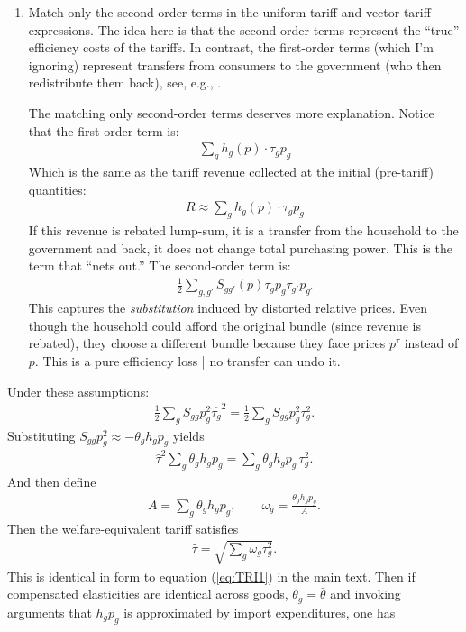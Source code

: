 \documentclass[12pt,pdftex]{article}
\begin{document}
\begin{onehalfspacing}
\begin{enumerate}
\item Match only the second-order terms in the uniform-tariff and vector-tariff expressions. The idea here is that the second-order terms represent the ``true'' efficiency costs of the tariffs. In contrast, the first-order terms (which I'm ignoring) represent transfers from consumers to the government (who then redistribute them back), see, e.g., \citet{feenstra1995estimating}.
    
    The matching only second-order terms deserves more explanation. Notice that the first-order term is:
\begin{align}
    \sum_g h_g(p) \cdot \tau_g p_g
\end{align}
Which is the same as the tariff revenue collected at the initial (pre-tariff) quantities:
\begin{align}
    R \approx \sum_g  h_g(p) \cdot \tau_g p_g 
\end{align}
If this revenue is rebated lump-sum, it is a transfer from the household to the government and back, it does not change total purchasing power. This is the term that ``nets out.'' The second-order term is:
\begin{align}
    \frac{1}{2} \sum_{g,g'} S_{gg'}(p) \tau_g p_g \tau_{g'} p_{g'}
\end{align}
This captures the \textit{substitution} induced by distorted relative prices. Even though the household could afford the original bundle (since revenue is rebated), they choose a different bundle because they face prices $p^\tau$ instead of $p$. This is a pure efficiency loss | no transfer can undo it. 
\end{enumerate}
Under these assumptions:
\begin{align}
\frac{1}{2} \sum_g S_{gg} p_g^2 \hat{\tau_g}^2
=
\frac{1}{2} \sum_g S_{gg} p_g^2 \tau_g^2.
\end{align}
Substituting $S_{gg} p_g^2 \approx -\theta_g h_g p_g$ yields
\begin{align}
\hat{\tau}^2 \sum_g \theta_g h_g p_g
=
\sum_g \theta_g h_g p_g\,\tau_g^2.
\end{align}
And then define
\begin{align}
A = \sum_g \theta_g h_g p_g,
\qquad
\omega_g = \frac{\theta_g h_g p_g}{A}.
\end{align}
Then the welfare-equivalent tariff satisfies
\begin{align}
\hat{\tau} = \sqrt{\sum_g \omega_g \tau_g^2}.
\label{eq:TRI_appendix}
\end{align}
This is identical in form to equation (\ref{eq:TRI1}) in the main text. Then if compensated elasticities are identical across goods, $\theta_g = \bar{\theta}$ and invoking arguments that $h_g p_g$ is approximated by import expenditures, one has

\end{onehalfspacing}
\end{document}
